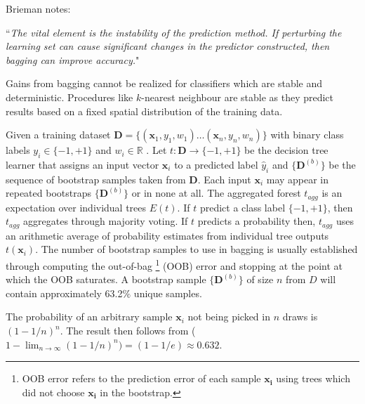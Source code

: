 Brieman notes:

``\textit{The vital element is the instability of the prediction method. If perturbing the learning set can cause significant changes in the predictor constructed, then bagging can improve accuracy.}"

Gains from bagging cannot be realized for classifiers which are stable and deterministic. Procedures like $k$-nearest neighbour are stable as they predict results based on a fixed spatial distribution of the training data. %
   
Given a training dataset $\mathbf{D} = \{(\mathbf{x}_{1},y_{1},w_{1}) \ldots (\mathbf{x}_{n},y_{n},w_{n})\}$ with binary class labels $y_{i} \in \{-1,+1\}$ and $w_{i} \in \mathbb{R}$  . Let $t: \mathbf{D} \rightarrow \{-1,+1\}$ be the decision tree learner that assigns an input vector $\mathbf{x}_{i}$ to a predicted label $\hat{y}_{i}$ and $\{\mathbf{D}^{(b)}\}$ be the sequence of bootstrap samples taken from $\mathbf{D}$. Each input $\mathbf{x}_{i}$ may appear in repeated bootstraps $\{\mathbf{D}^{(b)}\}$ or in none at all. The aggregated forest $t_{agg}$ is an expectation over individual trees $E(t)$. If $t$ predict a class label $\{-1,+1\}$, then $t_{agg}$ aggregates through majority voting. If $t$ predicts a probability then, $t_{agg}$ uses an arithmetic average of probability estimates from individual tree outputs $t(\mathbf{x}_{i})$. The number of bootstrap samples to use in bagging is usually established through computing the out-of-bag \footnote{OOB error refers to the prediction error of each sample $\mathbf{x_{i}}$ using trees which did not choose $\mathbf{x_{i}}$ in the bootstrap.} (OOB) error and stopping at the point at which the OOB saturates. A bootstrap sample $\{\mathbf{D}^{(b)}\}$ of size $n$ from $D$ will contain approximately 63.2$\%$ unique samples. 

The probability of an arbitrary sample $\mathbf{x}_{i}$ not being picked in $n$ draws is $(1-1/n)^{n}$. The result then follows from ($1 - \lim_{n \rightarrow \infty}(1 - 1/n)^n) =  (1 - 1/e) \approx 0.632$.


